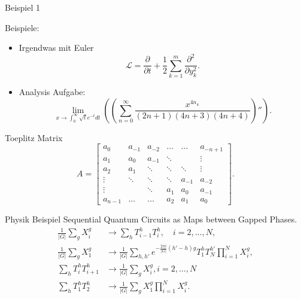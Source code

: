 \begin{frame}{Beispiel 1}


Beispiele:
\begin{itemize}
    \item Irgendwas mit Euler \cite{baranek2023randomized}
        \[ \mathcal{L} = \frac{\partial}{\partial t}+ \frac{1}{2}\sum_{k=1}^{m}\frac{\partial^2}{\partial y_{k}^2} .\] 
\end{itemize}


\begin{itemize}
    \item Analysis Aufgabe: 
        \[ \lim_{x\to \int_0^{\infty} \sqrt{t}e^{-t}dt}\left( \left( \sum_{n=0}^{\infty}\frac{x^{4n_4}}{(2n+1)(4n+3)(4n+4)} \right)''  \right) .\] 
\end{itemize}
\end{frame}

    



\begin{frame}{Toeplitz Matrix}
    \[ A=\begin{bmatrix}
            a_0 & a_{-1} & a_{-2} & \ldots & \ldots  &a_{-n+1}  \\
            a_1 & a_0  & a_{-1} &  \ddots   &  &  \vdots \\
            a_2 & a_1 & \ddots  & \ddots & \ddots& \vdots \\ 
            \vdots &  \ddots & \ddots &   \ddots  & a_{-1} & a_{-2}\\
            \vdots &         & \ddots & a_1 & a_0 &  a_{-1} \\
            a_{n-1} &  \ldots & \ldots & a_2 & a_1 & a_0
        \end{bmatrix} .\] 
\end{frame}



\begin{frame}{Physik Beispiel}
    Sequential Quantum Circuits as Maps between Gapped Phases.\cite{chen2023sequential}
    \begin{align*}
        \frac{1}{|G|}\sum_g X^g_i &\to \sum_h T^h_{i-1}T^h_i, \quad i=2,\ldots,N,  \\
        \frac{1}{|G|} \sum_g X_1^g &\to \frac{1}{|G|} \sum_{h,h'}e^{-\frac{2\pi i}{|G|}(h'-h)g}T_1^hT^{h'}_N \prod^N_{i=1}X_i^g,  \\
        \sum_h T^h_i T^h_{i+1} &\to \frac{1}{|G|} \sum_g X_i^g, i=2,\ldots,N  \\
        \sum_h T^h_1 T^h_2 &\to \frac{1}{|G|} \sum_g X_1^g \prod_{i=1}^N X_i^g.
    \end{align*}
\end{frame}




